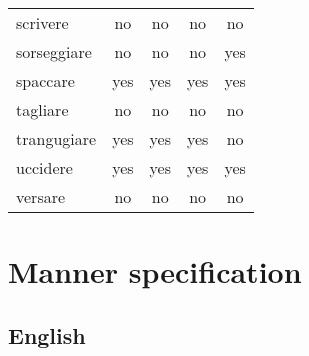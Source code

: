 \begin{longtable}{lc|ccc}
scrivere       & no       & no     & no          & no          \\
sorseggiare    & no       & no     & no          & yes         \\
spaccare       & yes      & yes    & yes         & yes         \\
tagliare       & no       & no     & no          & no          \\
trangugiare    & yes      & yes    & yes         & no          \\
uccidere       & yes      & yes    & yes         & yes         \\
versare        & no       & no     & no          & no         
\end{longtable}



\section{Manner specification} 

\subsection{English}

